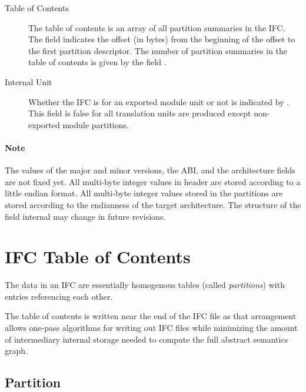 \begin{description}
\item[Table of Contents]
	The table of contents is an array of all partition summaries in the IFC.  The field  indicates the offset (in bytes)
	from the beginning of the offset to the first partition descriptor.  The number of partition summaries in the table of contents
	is given by the field .

\item[Internal Unit]
	Whether the IFC is for an exported module unit or not is indicated by .  This field is false for all
	translation units are produced except non-exported module partitions.

\end{description}

\paragraph{Note}
The values of the major and minor versions, the ABI, and the architecture fields
are not fixed yet.   All multi-byte integer values in header are stored according to a little endian format.  All multi-byte integer values
stored in the partitions are stored according to the endianness of the target architecture.
The structure of the field {internal} may change in future revisions.



\section{IFC Table of Contents}
\label{sec:ifc-toc}

The data in an IFC are essentially homogenous tables (called
\emph{partitions}) with entries referencing each other.  

The table of 
contents is written near the end of the IFC file as that arrangement
allows one-pass algorithms for writing out IFC files while minimizing
the amount of intermediary internal storage needed to compute the full
abstract semantics graph.

\subsection{Partition}
\label{sec:ifc-partition}

